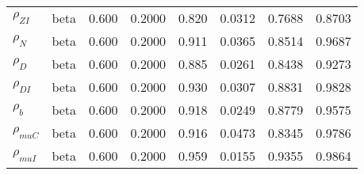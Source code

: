 \begin{center}
\begin{longtable}{llcccccc}
${\rho_{ZI}}$ & beta &   0.600 & 0.2000 &   0.820& 0.0312 &  0.7688 &  0.8703 \\ 
${\rho_N}$ & beta &   0.600 & 0.2000 &   0.911& 0.0365 &  0.8514 &  0.9687 \\ 
${\rho_D}$ & beta &   0.600 & 0.2000 &   0.885& 0.0261 &  0.8438 &  0.9273 \\ 
${\rho_{DI}}$ & beta &   0.600 & 0.2000 &   0.930& 0.0307 &  0.8831 &  0.9828 \\ 
${\rho_b}$ & beta &   0.600 & 0.2000 &   0.918& 0.0249 &  0.8779 &  0.9575 \\ 
${\rho_{muC}}$ & beta &   0.600 & 0.2000 &   0.916& 0.0473 &  0.8345 &  0.9786 \\ 
${\rho_{muI}}$ & beta &   0.600 & 0.2000 &   0.959& 0.0155 &  0.9355 &  0.9864 \\ 
\end{longtable}
 \end{center}
